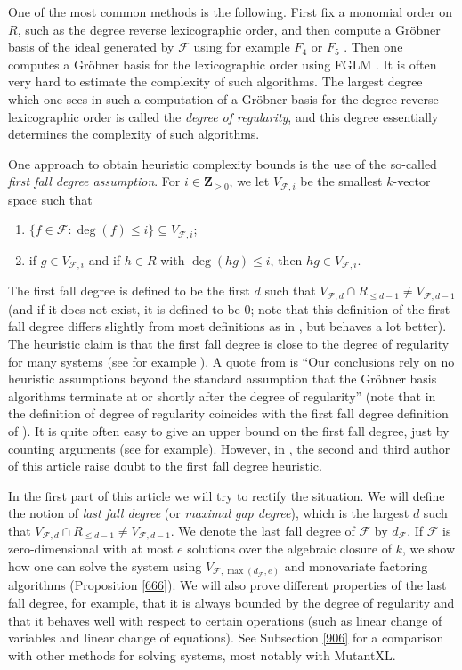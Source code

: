 \documentclass{amsart}
\theoremstyle{plain}
\theoremstyle{definition}
\begin{document}
One of the most common methods is the following. First fix a monomial order on $R$, such as the degree reverse lexicographic order, and then compute a Gr\"obner basis of the ideal generated by $\mathcal{F}$ using for example $F_4$ or $F_5$ \cite{FAU4, FAU5}. Then one computes a Gr\"obner basis for the lexicographic order using FGLM \cite{FAU6}. It is often very hard to estimate the complexity of such algorithms. The largest degree which one sees in such a computation of a Gr\"obner basis for the degree reverse lexicographic order is called the \emph{degree of regularity}, and this degree essentially determines the complexity of such algorithms.

One approach to obtain heuristic complexity bounds is the use of the so-called \emph{first fall degree assumption}. For $i \in {\mathbf{Z}}_{\geq 0}$, we let $V_{\mathcal{F},i}$ be the smallest $k$-vector space such that
\begin{enumerate}
\item
$\{f \in \mathcal{F}: \deg(f) \leq i \} \subseteq V_{\mathcal{F},i}$;
\item
if $g \in V_{\mathcal{F},i}$ and if $h \in R$ with $\deg(hg) \leq i$, then $hg \in V_{\mathcal{F},i}$.
\end{enumerate}
The first fall degree is defined to be the first $d$ such that $V_{\mathcal{F},d} \cap R_{\leq d-1} \neq V_{\mathcal{F},d-1}$ (and if it does not exist, it is defined to be $0$; note that this definition of the first fall degree differs slightly from most definitions as in \cite{PET}, but behaves a lot better). 
The heuristic claim is that the first fall degree is close to the degree of regularity for many systems (see for example \cite{PET}). A quote from \cite{DIN} is ``Our conclusions rely on no heuristic assumptions beyond the standard assumption that the Gr\"obner basis
algorithms terminate at or shortly after the degree of regularity'' (note that in \cite{DIN} the definition of degree of regularity coincides with the first fall degree definition of \cite{PET}). It is quite often easy to give an upper bound on the first fall degree, just by counting arguments (see \cite{DIN} for example). However, in \cite{KO14}, the second and third author of this article raise doubt to the first fall degree heuristic.

In the first part of this article we will try to rectify the situation. We will define the notion of \emph{last fall degree} (or \emph{maximal gap degree}), which is the largest $d$ such that $V_{\mathcal{F},d} \cap R_{\leq d-1} \neq V_{\mathcal{F},d-1}$. We denote the last fall degree of $\mathcal{F}$ by $d_{\mathcal{F}}$. If $\mathcal{F}$ is zero-dimensional with at most $e$ solutions over the algebraic closure of $k$, we show how one can solve the system using $V_{\mathcal{F},\max(d_{\mathcal{F}},e)}$ and monovariate factoring algorithms (Proposition \ref{666}). We will also prove different properties of the last fall degree, for example, that it is always bounded by the degree of regularity and that it behaves well with respect to certain operations (such as linear change of variables and linear change of equations). See Subsection \ref{906} for a comparison with other methods for solving systems, most notably with MutantXL.
\end{document}
